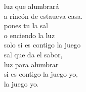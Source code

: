 \begin{cancion}
\begin{chorus}
	luz que alumbrará\\
	a rincón de estaueva casa.\\
	 pones tu la sal \\
	o enciendo la luz\\
	 solo si es contigo  la juego\\
	 sal que da el sabor, \\
	luz para alumbrar\\
	 si es contigo  la juego yo,\\
	 la juego yo.\\
	\end{chorus}%
	\jump\\
\end{cancion}%
